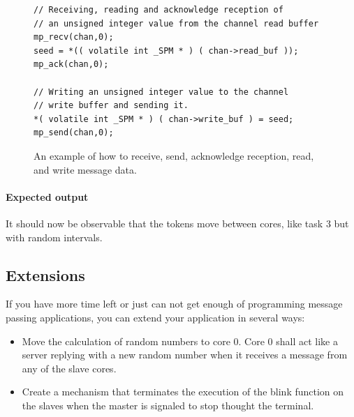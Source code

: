 \documentclass[a4paper,fontsize=10pt,twoside,DIV15,BCOR12mm,headinclude=true,footinclude=false,pagesize,bibtotoc]{scrbook}
\begin{document}
\begin{figure}
\begin{Verbatim}[xleftmargin=1cm,xrightmargin=1cm,frame=single,framesep=3mm]
// Receiving, reading and acknowledge reception of 
// an unsigned integer value from the channel read buffer
mp_recv(chan,0);
seed = *(( volatile int _SPM * ) ( chan->read_buf )); 
mp_ack(chan,0);

// Writing an unsigned integer value to the channel 
// write buffer and sending it.
*( volatile int _SPM * ) ( chan->write_buf ) = seed; 
mp_send(chan,0);
\end{Verbatim}
\caption{\label{fig:msg_data}An example of how to receive, send, acknowledge reception, read, and write message data.}
\end{figure}

\paragraph*{Expected output}
It should now be observable that the tokens move between cores, like task 3 but with random intervals.

\subsection{Extensions}
If you have more time left or just can not get enough of programming message passing applications, you can extend your application  in several ways:
\begin{itemize}
\item Move the calculation of random numbers to core 0.
Core 0 shall act like a server replying with a new random number when it receives a message from any of the slave cores.
\item Create a mechanism that terminates the execution of the blink function on the slaves when the master is signaled to stop thought the terminal. 
\end{itemize}
\end{document}
